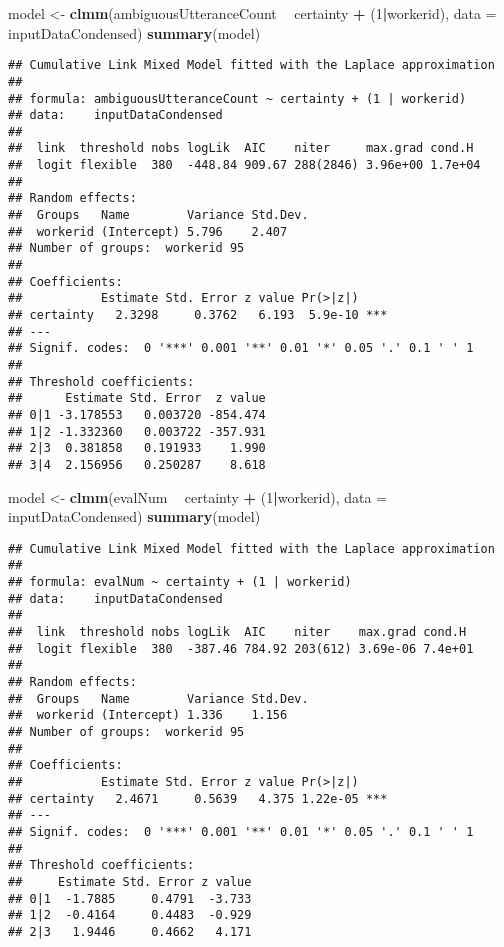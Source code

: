 \documentclass[]{article}
\newenvironment{Shaded}{\begin{snugshade}}{\end{snugshade}}
\newcommand{\DataTypeTok}[1]{\textcolor[rgb]{0.13,0.29,0.53}{#1}}
\newcommand{\DecValTok}[1]{\textcolor[rgb]{0.00,0.00,0.81}{#1}}
\newcommand{\KeywordTok}[1]{\textcolor[rgb]{0.13,0.29,0.53}{\textbf{#1}}}
\newcommand{\NormalTok}[1]{#1}
\newcommand{\OperatorTok}[1]{\textcolor[rgb]{0.81,0.36,0.00}{\textbf{#1}}}
\newcommand{\StringTok}[1]{\textcolor[rgb]{0.31,0.60,0.02}{#1}}
\begin{document}
\begin{Shaded}
\begin{Highlighting}[]
\NormalTok{model <-}\StringTok{ }\KeywordTok{clmm}\NormalTok{(ambiguousUtteranceCount }\OperatorTok{~}\StringTok{ }\NormalTok{certainty }\OperatorTok{+}\StringTok{ }\NormalTok{(}\DecValTok{1}\OperatorTok{|}\NormalTok{workerid), }\DataTypeTok{data =}\NormalTok{ inputDataCondensed)}
\KeywordTok{summary}\NormalTok{(model)}
\end{Highlighting}
\end{Shaded}

\begin{verbatim}
## Cumulative Link Mixed Model fitted with the Laplace approximation
## 
## formula: ambiguousUtteranceCount ~ certainty + (1 | workerid)
## data:    inputDataCondensed
## 
##  link  threshold nobs logLik  AIC    niter     max.grad cond.H 
##  logit flexible  380  -448.84 909.67 288(2846) 3.96e+00 1.7e+04
## 
## Random effects:
##  Groups   Name        Variance Std.Dev.
##  workerid (Intercept) 5.796    2.407   
## Number of groups:  workerid 95 
## 
## Coefficients:
##           Estimate Std. Error z value Pr(>|z|)    
## certainty   2.3298     0.3762   6.193  5.9e-10 ***
## ---
## Signif. codes:  0 '***' 0.001 '**' 0.01 '*' 0.05 '.' 0.1 ' ' 1
## 
## Threshold coefficients:
##      Estimate Std. Error  z value
## 0|1 -3.178553   0.003720 -854.474
## 1|2 -1.332360   0.003722 -357.931
## 2|3  0.381858   0.191933    1.990
## 3|4  2.156956   0.250287    8.618
\end{verbatim}

\begin{Shaded}
\begin{Highlighting}[]
\NormalTok{model <-}\StringTok{ }\KeywordTok{clmm}\NormalTok{(evalNum }\OperatorTok{~}\StringTok{ }\NormalTok{certainty }\OperatorTok{+}\StringTok{ }\NormalTok{(}\DecValTok{1}\OperatorTok{|}\NormalTok{workerid), }\DataTypeTok{data =}\NormalTok{ inputDataCondensed)}
\KeywordTok{summary}\NormalTok{(model)}
\end{Highlighting}
\end{Shaded}

\begin{verbatim}
## Cumulative Link Mixed Model fitted with the Laplace approximation
## 
## formula: evalNum ~ certainty + (1 | workerid)
## data:    inputDataCondensed
## 
##  link  threshold nobs logLik  AIC    niter    max.grad cond.H 
##  logit flexible  380  -387.46 784.92 203(612) 3.69e-06 7.4e+01
## 
## Random effects:
##  Groups   Name        Variance Std.Dev.
##  workerid (Intercept) 1.336    1.156   
## Number of groups:  workerid 95 
## 
## Coefficients:
##           Estimate Std. Error z value Pr(>|z|)    
## certainty   2.4671     0.5639   4.375 1.22e-05 ***
## ---
## Signif. codes:  0 '***' 0.001 '**' 0.01 '*' 0.05 '.' 0.1 ' ' 1
## 
## Threshold coefficients:
##     Estimate Std. Error z value
## 0|1  -1.7885     0.4791  -3.733
## 1|2  -0.4164     0.4483  -0.929
## 2|3   1.9446     0.4662   4.171
\end{verbatim}
\end{document}
